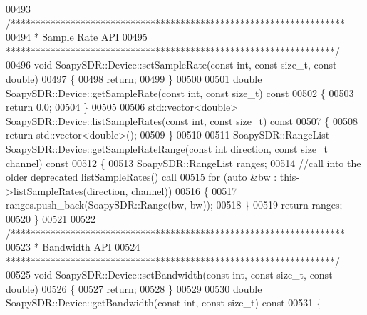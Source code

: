 \begin{DoxyCode}
00493 \textcolor{comment}{/*******************************************************************}
00494 \textcolor{comment}{ * Sample Rate API}
00495 \textcolor{comment}{ ******************************************************************/}
00496 \textcolor{keywordtype}{void} SoapySDR::Device::setSampleRate(\textcolor{keyword}{const} \textcolor{keywordtype}{int}, \textcolor{keyword}{const} \textcolor{keywordtype}{size\_t}, \textcolor{keyword}{const} \textcolor{keywordtype}{double})
00497 \{
00498     \textcolor{keywordflow}{return};
00499 \}
00500 
00501 \textcolor{keywordtype}{double} SoapySDR::Device::getSampleRate(\textcolor{keyword}{const} \textcolor{keywordtype}{int}, \textcolor{keyword}{const} \textcolor{keywordtype}{size\_t})\textcolor{keyword}{ const}
00502 \textcolor{keyword}{}\{
00503     \textcolor{keywordflow}{return} 0.0;
00504 \}
00505 
00506 std::vector<double> SoapySDR::Device::listSampleRates(\textcolor{keyword}{const} \textcolor{keywordtype}{int}, \textcolor{keyword}{const} \textcolor{keywordtype}{size\_t})\textcolor{keyword}{ const}
00507 \textcolor{keyword}{}\{
00508     \textcolor{keywordflow}{return} std::vector<double>();
00509 \}
00510 
00511 SoapySDR::RangeList SoapySDR::Device::getSampleRateRange(\textcolor{keyword}{const} \textcolor{keywordtype}{int} direction, \textcolor{keyword}{const} \textcolor{keywordtype}{size\_t} channel)\textcolor{keyword}{ const}
00512 \textcolor{keyword}{}\{
00513     SoapySDR::RangeList ranges;
00514     \textcolor{comment}{//call into the older deprecated listSampleRates() call}
00515     \textcolor{keywordflow}{for} (\textcolor{keyword}{auto} &bw : this->listSampleRates(direction, channel))
00516     \{
00517         ranges.push\_back(SoapySDR::Range(bw, bw));
00518     \}
00519     \textcolor{keywordflow}{return} ranges;
00520 \}
00521 
00522 \textcolor{comment}{/*******************************************************************}
00523 \textcolor{comment}{ * Bandwidth API}
00524 \textcolor{comment}{ ******************************************************************/}
00525 \textcolor{keywordtype}{void} SoapySDR::Device::setBandwidth(\textcolor{keyword}{const} \textcolor{keywordtype}{int}, \textcolor{keyword}{const} \textcolor{keywordtype}{size\_t}, \textcolor{keyword}{const} \textcolor{keywordtype}{double})
00526 \{
00527     \textcolor{keywordflow}{return};
00528 \}
00529 
00530 \textcolor{keywordtype}{double} SoapySDR::Device::getBandwidth(\textcolor{keyword}{const} \textcolor{keywordtype}{int}, \textcolor{keyword}{const} \textcolor{keywordtype}{size\_t})\textcolor{keyword}{ const}
00531 \textcolor{keyword}{}\{

\end{DoxyCode}
